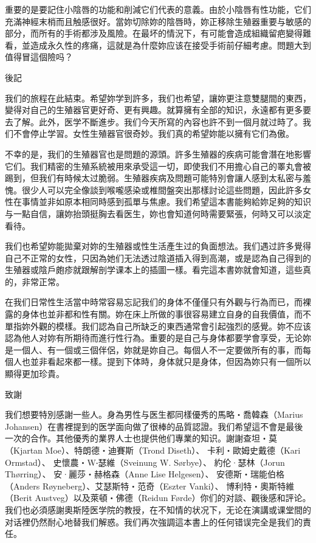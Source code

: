 \documentclass[12pt,UTF8]{ctexbook}
\begin{document}
重要的是要記住小陰唇的功能和削減它们代表的意義。由於小陰唇有性功能，它们充滿神經末梢而且触感很好。當妳切除妳的陰唇時，妳正移除生殖器重要与敏感的部分，而所有的手術都涉及風險。在最坏的情況下，有可能會造成組織留疤變得難看，並造成永久性的疼痛，這就是為什麼妳应该在接受手術前仔細考慮。問題大到值得冒這個險吗？







\backmatter

後記





我们的旅程在此結束。希望妳学到許多，我们也希望，讓妳更注意雙腿間的東西，變得对自己的生殖器官更好奇、更有興趣。就算擁有全部的知识，永遠都有更多要去了解。此外，医学不斷進步。我们今天所寫的內容也許不到一個月就过時了。我们不會停止学習。女性生殖器官很奇妙。我们真的希望妳能以擁有它们為傲。

不幸的是，我们的生殖器官也是問題的源頭。許多生殖器的疾病可能會潛在地影響它们。我们精密的生殖系統被用來承受這一切，即使我们不用擔心自己的睪丸會被踢到，但我们有時候太过脆弱。生殖器疾病及問題可能特別會讓人感到太私密与羞愧。很少人可以完全像談到喉嚨感染或椎間盤突出那樣討论這些問題，因此許多女性在事情並非如原本相同時感到孤單与焦慮。我们希望這本書能夠給妳足夠的知识与一點自信，讓妳抬頭挺胸去看医生，妳也會知道何時需要緊張，何時又可以淡定看待。

我们也希望妳能拋棄对妳的生殖器或性生活產生过的負面想法。我们遇过許多覺得自己不正常的女性，只因為她们无法透过陰道插入得到高潮，或是認為自己得到的生殖器或陰戶皰疹就跟解剖学课本上的插圖一樣。看完這本書妳就會知道，這些真的，非常正常。

在我们日常性生活當中時常容易忘記我们的身体不僅僅只有外觀与行為而已，而裸露的身体也並非都和性有關。妳在床上所做的事很容易建立自身的自我價值，而不單指妳外觀的模樣。我们認為自己所缺乏的東西通常會引起強烈的感覺。妳不应该認為他人对妳有所期待而進行性行為。重要的是自己与身体都要学會享受，无论妳是一個人、有一個或三個伴侶，妳就是妳自己。每個人不一定要做所有的事，而每個人也並非看起來都一樣。提到下体時，身体就只是身体，但因為妳只有一個所以顯得更加珍貴。





致謝





我们想要特別感謝一些人。身為男性与医生都同樣優秀的馬略‧喬韓森（Marius Johansen）在書裡提到的医学面向做了很棒的品質認證。我们希望這不會是最後一次的合作。其他優秀的業界人士也提供他们專業的知识。謝謝查坦‧莫（Kjartan Moe）、特朗德‧迪賽斯（Trond Diseth）、 卡利‧歐姆史戴德（Kari Ormstad）、 史懷農‧W‧瑟維（Sveinung W. Sørbye）、 約伦·瑟林（Jorun Thørring）、 安·麗莎‧赫格森（Anne Lise Helgesen）、 安德斯‧瑞能伯格（Anders Røyneberg）、艾瑟斯特‧范奇（Eszter Vanki）、 博利特‧奧斯特維（Berit Austveg）以及萊頓‧佛德（Reidun Førde）你们的对談、觀後感和評论。我们也必須感謝奧斯陸医学院的教授，在不知情的状况下，无论在演講或课堂間的对话裡仍然耐心地替我们解惑。我们再次強調這本書上的任何错误完全是我们的責任。
\end{document}
